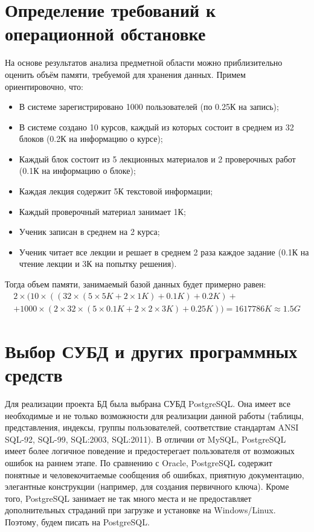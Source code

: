 \documentclass[a4paper,14pt]{article}
\begin{document}
\section{Определение требований к операционной обстановке}
На основе результатов анализа предметной области можно приблизительно оценить объём памяти, требуемой для хранения данных.
Примем ориентировочно, что:
\begin{itemize}
	\item В системе зарегистрировано 1000 пользователей (по 0.25К на запись);
	\item В системе создано 10 курсов, каждый из которых состоит в среднем из 32 блоков (0.2К на информацию о курсе);
	\item Каждый блок состоит из 5 лекционных материалов и 2 проверочных работ (0.1К на информацию о блоке);
	\item Каждая лекция содержит 5К текстовой информации;
	\item Каждый проверочный материал занимает 1К;
	\item Ученик записан в среднем на 2 курса;
	\item Ученик читает все лекции и решает в среднем 2 раза каждое задание (0.1К на чтение лекции и 3К на попытку решения).
\end{itemize}

Тогда объем памяти, занимаемый базой данных будет примерно равен:
\begin{multline*}
2 \times( 10 \times ((32 \times (5 \times 5K + 2 \times 1K) + 0.1K) + 0.2K) + \\ 
+ 1000 \times (2 \times 32 \times (5 \times 0.1K + 2 \times 2 \times 3K) + 0.25K)) = 1617786K	\approx 1.5G
\end{multline*}

\section{Выбор СУБД и других программных средств}
Для реализации проекта БД была выбрана СУБД PostgreSQL.
Она имеет все необходимые и не только возможности для реализации данной работы (таблицы, представления, индексы, группы пользователей, соответствие стандартам ANSI SQL-92, SQL-99, SQL:2003, SQL:2011).
В отличии от MySQL, PostgreSQL имеет более логичное поведение и предостерегает пользователя от возможных ошибок на раннем этапе.
По сравнению с Oracle, PostgreSQL содержит понятные и человекочитаемые сообщения об ошибках, приятную документацию, элегантные конструкции (например, для создания первичного ключа).
Кроме того, PostgreSQL занимает не так много места и не предоставляет дополнительных страданий при загрузке и установке на Windows/Linux.
Поэтому, будем писать на PostgreSQL.
\end{document}

